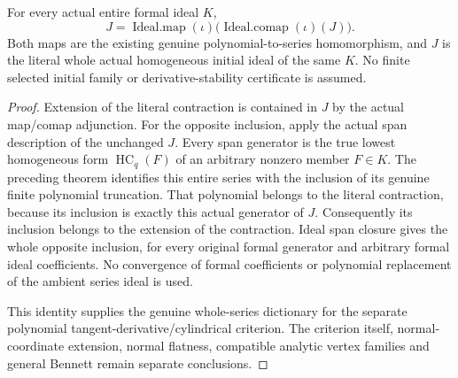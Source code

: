 \begin{theorem}
\label{hir:actual-whole-initial-ideal-polynomial-contraction-extension}
\leanok
For every actual entire formal ideal $K$,
\[
 J=\operatorname{Ideal.map}(\iota)
       \bigl(\operatorname{Ideal.comap}(\iota)(J)\bigr).
\]
Both maps are the existing genuine polynomial-to-series homomorphism,
and $J$ is the literal whole actual homogeneous initial ideal of the
same $K$. No finite selected initial family or derivative-stability
certificate is assumed.
\end{theorem}
\begin{proof}
Extension of the literal contraction is contained in $J$ by the
actual map/comap adjunction. For the opposite inclusion, apply the
actual span description of the unchanged $J$. Every span generator
is the true lowest homogeneous form $\operatorname{HC}_q(F)$ of an
arbitrary nonzero member $F\in K$. The preceding theorem identifies
this entire series with the inclusion of its genuine finite
polynomial truncation. That polynomial belongs to the literal
contraction, because its inclusion is exactly this actual generator
of $J$. Consequently its inclusion belongs to the extension of the
contraction. Ideal span closure gives the whole opposite inclusion,
for every original formal generator and arbitrary formal ideal
coefficients. No convergence of formal coefficients or polynomial
replacement of the ambient series ideal is used.

This identity supplies the genuine whole-series dictionary for the
separate polynomial tangent-derivative/cylindrical criterion. The
criterion itself, normal-coordinate extension, normal flatness,
compatible analytic vertex families and general Bennett remain
separate conclusions.
\end{proof}
